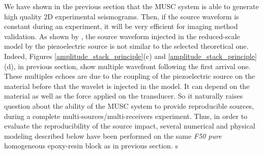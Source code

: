 \documentclass[manuscript,revised]{geophysics}
\begin{document}
\noindent We have shown in the previous section that the MUSC system is able to generate high quality 2D experimental seismograms. Then, if the source waveform is constant during an experiment, it will be very efficient for imaging method validation. As shown by \citet{Bretaudeau_SSM_2011}, the source waveform injected in the reduced-scale model by the piezoelectric source is not similar to the selected theoretical one. Indeed, Figures \ref{amplitude_stack_principle}(c) and \ref{amplitude_stack_principle}(d), in previous section, show multiple wavefront following the first arrival one. These multiples echoes are due to the coupling of the piezoelectric source on the material before that the wavelet is injected in the model. It can depend on the material as well as the force applied on the transducer. So it naturally raises question about the ability of the MUSC system to provide reproducible sources, during a complete multi-sources/multi-receivers experiment. Thus, in order to evaluate the reproducibility of the source impact, several numerical and physical modeling described below have been performed on the same \textit{F50 pure} homogeneous epoxy-resin block as in previous section. s
\end{document}
